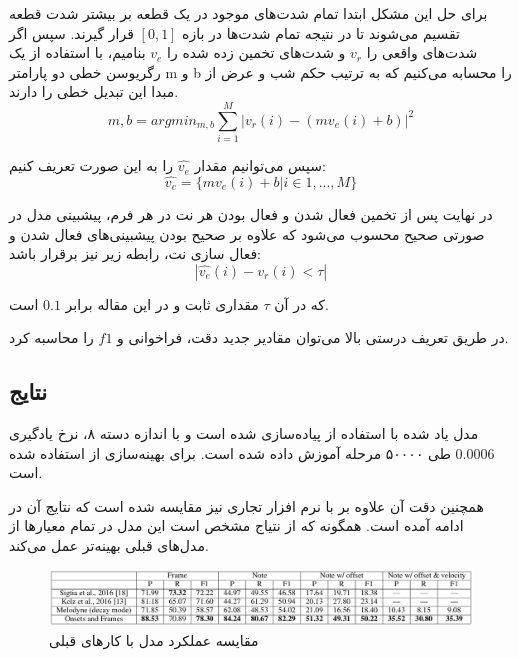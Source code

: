 برای حل این مشکل ابتدا تمام شدت‌های موجود در یک قطعه بر بیشتر شدت قطعه تقسیم
می‌شوند تا در نتیجه تمام شدت‌ها در بازه
$[0,1]$
قرار گیرند. سپس اگر شدت‌های واقعی را 
$v_r$
و شدت‌های تخمین زده شده را
$v_e$
بنامیم، با استفاده از یک رگریوسن خطی دو پارامتر
m
و
b
را محسابه می‌کنیم که به ترتیب حکم شب و عرض از مبدا این تبدیل خطی را دارند.
\begin{equation}
    m, b = argmin_{m, b} \sum_{i=1}^{M}
    | v_r(i) - (mv_e(i) + b) |^2
\end{equation}

سپس می‌توانیم مقدار
$\hat{v_e}$
را به این صورت تعریف کنیم:
\begin{equation}
    \hat{v_e} = \{ mv_e(i) + b | i \in 1, ... ,M \}
\end{equation}

در نهایت پس از تخمین فعال شدن و فعال بودن هر نت در هر فرم، پیشبینی مدل در صورتی
صحیح محسوب می‌شود که علاوه بر صحیح بودن پیشبینی‌های فعال شدن و فعال سازی نت، رابطه
زیر نیز برقرار باشد:
\begin{equation}
    | \hat{v_e}(i) - v_r(i) < \tau |
\end{equation}

که در آن
$\tau$
مقداری ثابت و در این مقاله برابر
$0.1$
است.

در طریق تعریف درستی بالا می‌توان مقادیر جدید دقت، فراخوانی و
$f1$
را محاسبه کرد.

\subsection{نتایج}
مدل یاد شده با استفاده از
پیاده‌سازی شده است
\cite{abadi2016tensorflow}
و با اندازه دسته ۸، نرخ یادگیری
$0.0006$
طی ۵۰۰۰۰ مرحله آموزش داده شده است. برای بهینه‌سازی از
\cite{kingma2014adam}
استفاده شده است. 

همچنین دقت آن علاوه بر
\cite{sigtia2016end,kelz2016potential}
با نرم افزار تجاری
نیز مقایسه شده است که نتایج آن در ادامه آمده است. همگونه که از نتیاج مشخص است
این مدل در تمام معیارها از مدل‌های قبلی بهینه‌تر عمل می‌کند.

\begin{figure}
    \includegraphics[width=\linewidth]
    {./statics/hawthorne2017onsets_results.png}
    \caption{مقایسه عملکرد مدل \cite{hawthorne2017onsets} با کارهای قبلی}
\end{figure}

